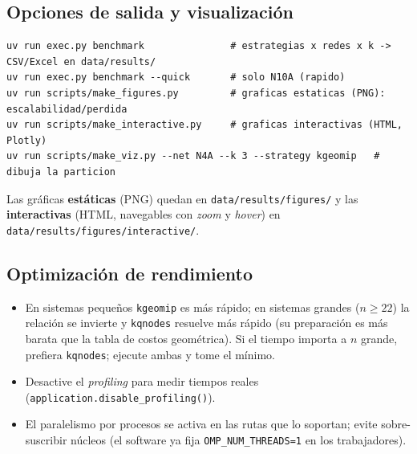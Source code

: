 \documentclass[11pt,letterpaper]{article}
\begin{document}
\subsection{Opciones de salida y visualización}
\begin{lstlisting}[style=sh]
uv run exec.py benchmark               # estrategias x redes x k -> CSV/Excel en data/results/
uv run exec.py benchmark --quick       # solo N10A (rapido)
uv run scripts/make_figures.py         # graficas estaticas (PNG): escalabilidad/perdida
uv run scripts/make_interactive.py     # graficas interactivas (HTML, Plotly)
uv run scripts/make_viz.py --net N4A --k 3 --strategy kgeomip   # dibuja la particion
\end{lstlisting}
Las gráficas \textbf{estáticas} (PNG) quedan en \texttt{data/results/figures/} y las
\textbf{interactivas} (HTML, navegables con \emph{zoom} y \emph{hover}) en
\texttt{data/results/figures/interactive/}.

\subsection{Optimización de rendimiento}
\begin{itemize}
	\item En sistemas pequeños \texttt{kgeomip} es más rápido; en sistemas grandes
	      ($n\ge 22$) la relación se invierte y \texttt{kqnodes} resuelve más rápido
	      (su preparación es más barata que la tabla de costos geométrica). Si el tiempo
	      importa a $n$ grande, prefiera \texttt{kqnodes}; ejecute ambas y tome el mínimo.
	\item Desactive el \emph{profiling} para medir tiempos reales
	      (\texttt{application.disable\_profiling()}).
	\item El paralelismo por procesos se activa en las rutas que lo soportan; evite
	      sobre-suscribir núcleos (el software ya fija \texttt{OMP\_NUM\_THREADS=1} en los
	      trabajadores).
\end{itemize}

\end{document}
